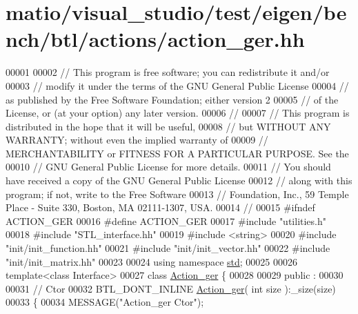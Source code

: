 \hypertarget{matio_2visual__studio_2test_2eigen_2bench_2btl_2actions_2action__ger_8hh_source}{}\section{matio/visual\+\_\+studio/test/eigen/bench/btl/actions/action\+\_\+ger.hh}
\label{matio_2visual__studio_2test_2eigen_2bench_2btl_2actions_2action__ger_8hh_source}

\begin{DoxyCode}
00001 
00002 \textcolor{comment}{// This program is free software; you can redistribute it and/or}
00003 \textcolor{comment}{// modify it under the terms of the GNU General Public License}
00004 \textcolor{comment}{// as published by the Free Software Foundation; either version 2}
00005 \textcolor{comment}{// of the License, or (at your option) any later version.}
00006 \textcolor{comment}{//}
00007 \textcolor{comment}{// This program is distributed in the hope that it will be useful,}
00008 \textcolor{comment}{// but WITHOUT ANY WARRANTY; without even the implied warranty of}
00009 \textcolor{comment}{// MERCHANTABILITY or FITNESS FOR A PARTICULAR PURPOSE.  See the}
00010 \textcolor{comment}{// GNU General Public License for more details.}
00011 \textcolor{comment}{// You should have received a copy of the GNU General Public License}
00012 \textcolor{comment}{// along with this program; if not, write to the Free Software}
00013 \textcolor{comment}{// Foundation, Inc., 59 Temple Place - Suite 330, Boston, MA  02111-1307, USA.}
00014 \textcolor{comment}{//}
00015 \textcolor{preprocessor}{#ifndef ACTION\_GER}
00016 \textcolor{preprocessor}{#define ACTION\_GER}
00017 \textcolor{preprocessor}{#include "utilities.h"}
00018 \textcolor{preprocessor}{#include "STL\_interface.hh"}
00019 \textcolor{preprocessor}{#include <string>}
00020 \textcolor{preprocessor}{#include "init/init\_function.hh"}
00021 \textcolor{preprocessor}{#include "init/init\_vector.hh"}
00022 \textcolor{preprocessor}{#include "init/init\_matrix.hh"}
00023 
00024 \textcolor{keyword}{using namespace }\hyperlink{namespacestd}{std};
00025 
00026 \textcolor{keyword}{template}<\textcolor{keyword}{class} Interface>
00027 \textcolor{keyword}{class }\hyperlink{class_action__ger}{Action\_ger} \{
00028 
00029 public :
00030 
00031   \textcolor{comment}{// Ctor}
00032   BTL\_DONT\_INLINE \hyperlink{class_action__ger}{Action\_ger}( \textcolor{keywordtype}{int} size ):\_size(size)
00033   \{
00034     MESSAGE(\textcolor{stringliteral}{"Action\_ger Ctor"});

\end{DoxyCode}

